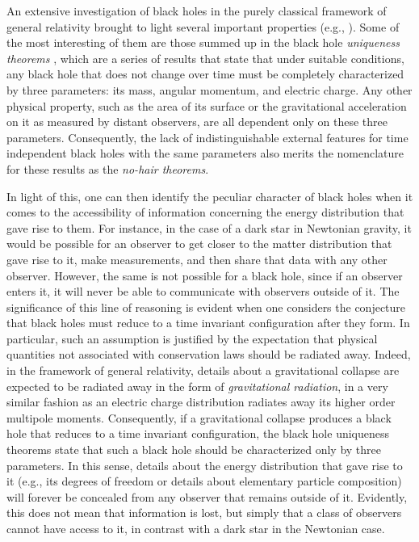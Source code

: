 \documentclass[
12pt,		%
openright,	%
twoside,  %
a4paper,			%
chapter=TITLE,		%
english,			%
french,				%
spanish,			%
brazil				%
]{USPSC-classe/USPSC}
\begin{document}
An extensive investigation of black holes in the purely classical framework of general relativity brought to light several important properties (e.g., \cite{Israel1967, Carter1971,Penrose1971, Hawking1971, Hawking1973, Bardeen1973}). Some of the most interesting of them are those summed up in the black hole \textit{uniqueness theorems} \cite{Heusler1996}, which are a series of results that state that under suitable conditions, any black hole that does not change over time must be completely characterized by three parameters: its mass, angular momentum, and electric charge. Any other physical property, such as the area of its surface or the gravitational acceleration on it as measured by distant observers, are all dependent only on these three parameters. Consequently, the lack of indistinguishable external features for time independent black holes with the same parameters also merits the nomenclature for these results as the \textit{no-hair theorems}.

In light of this, one can then identify the peculiar character of black holes when it comes to the accessibility of information concerning the energy distribution that gave rise to them. For instance, in the case of a dark star in Newtonian gravity, it would be possible for an observer to get closer to the matter distribution that gave rise to it, make measurements, and then share that data with any other observer. However, the same is not possible for a black hole, since if an observer enters it, it will never be able to communicate with observers outside of it. The significance of this line of reasoning is evident when one considers the conjecture that black holes must reduce to a time invariant configuration after they form. In particular, such an assumption is justified by the expectation that physical quantities not associated with conservation laws should be radiated away. Indeed, in the framework of general relativity, details about a gravitational collapse are expected to be radiated away in the form of \textit{gravitational radiation}, in a very similar fashion as an electric charge distribution radiates away its higher order multipole moments. Consequently, if a gravitational collapse produces a black hole that reduces to a time invariant configuration, the black hole uniqueness theorems state that such a black hole should be characterized only by three parameters. In this sense, details about the energy distribution that gave rise to it (e.g., its degrees of freedom or details about elementary particle composition) will forever be concealed from any observer that remains outside of it. Evidently, this does not mean that information is lost, but simply that a class of observers cannot have access to it, in contrast with a dark star in the Newtonian case.
\end{document}
